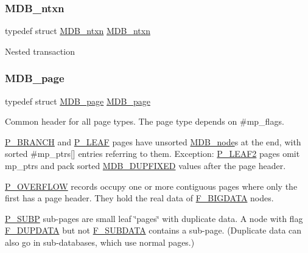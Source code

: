 \subsubsection{\texorpdfstring{M\+D\+B\+\_\+ntxn}{MDB\_ntxn}}
{\footnotesize\ttfamily typedef struct \mbox{\hyperlink{struct_m_d_b__ntxn}{M\+D\+B\+\_\+ntxn}}  \mbox{\hyperlink{struct_m_d_b__ntxn}{M\+D\+B\+\_\+ntxn}}}

Nested transaction \mbox{\label{group__internal_ga200680e541f7a879b55362b90bea3f2a}} 
\subsubsection{\texorpdfstring{M\+D\+B\+\_\+page}{MDB\_page}}
{\footnotesize\ttfamily typedef struct \mbox{\hyperlink{struct_m_d_b__page}{M\+D\+B\+\_\+page}}  \mbox{\hyperlink{struct_m_d_b__page}{M\+D\+B\+\_\+page}}}

Common header for all page types. The page type depends on \#mp\+\_\+flags.

\mbox{\hyperlink{group__mdb__page_gad6639bfcad26dbcbf7970dfa28f1a930}{P\+\_\+\+B\+R\+A\+N\+CH}} and \mbox{\hyperlink{group__mdb__page_gac85fb59a9a2eda0d33e58b23a7ca019a}{P\+\_\+\+L\+E\+AF}} pages have unsorted \textquotesingle{}\mbox{\hyperlink{struct_m_d_b__node}{M\+D\+B\+\_\+node}}\textquotesingle{}s at the end, with sorted \#mp\+\_\+ptrs\mbox{[}\mbox{]} entries referring to them. Exception\+: \mbox{\hyperlink{group__mdb__page_ga9c80486a549b2efbd5561cdd4df238c4}{P\+\_\+\+L\+E\+A\+F2}} pages omit mp\+\_\+ptrs and pack sorted \mbox{\hyperlink{group__mdb__dbi__open_ga5acc26f80668d1ebc31265d178c69338}{M\+D\+B\+\_\+\+D\+U\+P\+F\+I\+X\+ED}} values after the page header.

\mbox{\hyperlink{group__mdb__page_ga15141fe5d59efdf035bf8862250c25d7}{P\+\_\+\+O\+V\+E\+R\+F\+L\+OW}} records occupy one or more contiguous pages where only the first has a page header. They hold the real data of \mbox{\hyperlink{group__mdb__node_gafbd60c1d77d9343d044d0792754e42f0}{F\+\_\+\+B\+I\+G\+D\+A\+TA}} nodes.

\mbox{\hyperlink{group__mdb__page_ga77cc6dc98fda40c81fb2f75068fb5551}{P\+\_\+\+S\+U\+BP}} sub-\/pages are small leaf \char`\"{}pages\char`\"{} with duplicate data. A node with flag \mbox{\hyperlink{group__mdb__node_ga6e93fc5b62c03a0b85d0755b7d19bee5}{F\+\_\+\+D\+U\+P\+D\+A\+TA}} but not \mbox{\hyperlink{group__mdb__node_ga5323896692f7418870f72d7a5f1b2bab}{F\+\_\+\+S\+U\+B\+D\+A\+TA}} contains a sub-\/page. (Duplicate data can also go in sub-\/databases, which use normal pages.)

